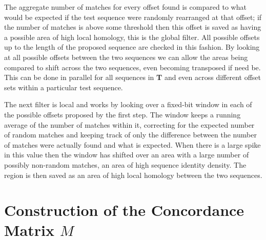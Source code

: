 \documentclass[phd,tocprelim]{cornell}
\begin{document}
The aggregate number of matches for every offset found is compared to what would be expected if the test sequence were randomly rearranged at that offset; if the number of matches is above some threshold then this offset is saved as having a possible area of high local homology, this is the global filter. All possible offsets up to the length of the proposed sequence are checked in this fashion. By looking at all possible offsets between the two sequences we can allow the areas being compared to shift across the two sequences, even becoming transposed if need be. This can be done in parallel for all sequences in \textbf{T} and even across different offset sets within a particular test sequence.

The next filter is local and works by looking over a fixed-bit window in each of the possible offsets proposed by the first step. The window keeps a running average of the number of matches within it, correcting for the expected number of random matches and keeping track of only the difference between the number of matches were actually found and what is expected. When there is a large spike in this value then the window has shifted over an area with a large number of possibly non-random matches, an area of high sequence identity density. The region is then saved as an area of high local homology between the two sequences.

\section{Construction of the Concordance Matrix $M$}
\end{document}
